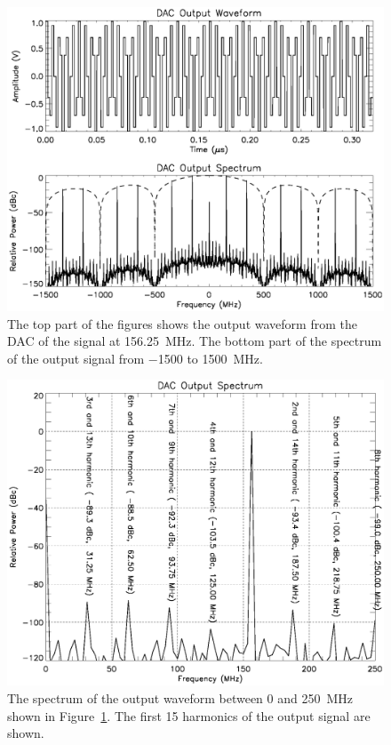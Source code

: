\documentclass[12pt,letterpaper]{article}
\begin{document}
\begin{figure}[htbp]
  \centering
  \includegraphics[scale=0.8]{spectrum-images.eps}
  \caption{The top part of the figures shows the output waveform from
    the DAC of the signal at 156.25~MHz. The bottom part of the spectrum
    of the output signal from $-$1500 to 1500~MHz.}
  \label{fig:spectrum_images}
\end{figure}

\begin{figure}[htbp]
  \centering
  \includegraphics[scale=0.8]{spectrum-harmonics.eps}
  \caption{The spectrum of the output waveform between 0 and 250~MHz
    shown in Figure~\ref{fig:spectrum_images}. The first 15 harmonics of
    the output signal are shown.}
  \label{fig:spectrum_harmonics}
\end{figure}
\end{document}
